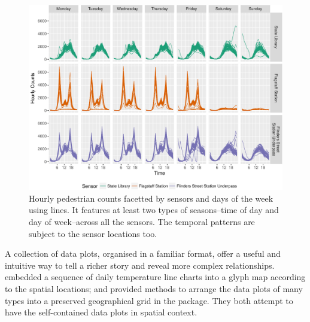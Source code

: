 \documentclass[article]{jss}
\begin{document}
\begin{CodeChunk}
\begin{figure}

{\centering \includegraphics[width=\textwidth]{figure/facet-time-1} 

}

\caption[Hourly pedestrian counts facetted by sensors and days of the week using lines]{Hourly pedestrian counts facetted by sensors and days of the week using lines. It features at least two types of seasons--time of day and day of week--across all the sensors. The temporal patterns are subject to the sensor locations too.}\label{fig:facet-time}
\end{figure}
\end{CodeChunk}

A collection of data plots, organised in a familiar format, offer a
useful and intuitive way to tell a richer story and reveal more complex
relationships. \citet{Wickham2012glyph} embedded a sequence of daily
temperature line charts into a glyph map according to the spatial
locations; and \citet{R-geofacet} provided methods to arrange the data
plots of many types into a preserved geographical grid in the
 package. They both attempt to have the self-contained
data plots in spatial context.
\end{document}
